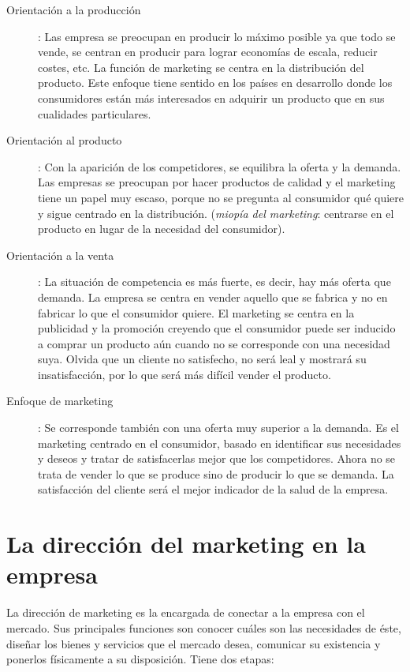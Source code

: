 \documentclass[10pt,a4paper,spanish]{report}
\begin{document}
		\begin{description}
			\item[Orientación a la producción]: Las empresa se preocupan en producir lo máximo posible ya que todo se vende, se centran en producir para lograr economías de escala, reducir costes, etc. La función de marketing se centra en la distribución del producto. Este enfoque tiene sentido en los países en desarrollo donde los consumidores están más interesados en adquirir un producto que en sus cualidades particulares.

			\item[Orientación al producto]: Con la aparición de los competidores, se equilibra la oferta y la demanda. Las empresas se preocupan por hacer productos de calidad y el marketing tiene un papel muy escaso, porque no se pregunta al consumidor qué quiere y sigue centrado en la distribución. (\textit{\textcolor[rgb]{0.1,0.2,0.4}{miopía del marketing}}: centrarse en el producto en lugar de la necesidad del consumidor).

			\item[Orientación a la venta]: La situación de competencia es más fuerte, es decir, hay más oferta que demanda. La empresa se centra en vender aquello que se fabrica y no en fabricar lo que el consumidor quiere. El marketing se centra en la publicidad y la promoción creyendo que el consumidor puede ser inducido a comprar un producto aún cuando no se corresponde con una necesidad suya. Olvida que un cliente no satisfecho, no será leal y mostrará su insatisfacción, por lo que será más difícil vender el producto.

			\item[Enfoque de marketing]: Se corresponde también con una oferta muy superior a la demanda. Es el marketing centrado en el consumidor, basado en identificar sus necesidades y deseos y tratar de satisfacerlas mejor que los competidores. Ahora no se trata de vender lo que se produce sino de producir lo que se demanda. La satisfacción del cliente será el mejor indicador de la salud de la empresa.
		\end{description}

	\section{\textcolor[rgb]{0.1,0.2,0.4}La dirección del marketing en la empresa}

		La dirección de marketing es la encargada de conectar a la empresa con el mercado. Sus principales funciones son conocer cuáles son las necesidades de éste, diseñar los bienes y servicios que el mercado desea, comunicar su existencia y ponerlos físicamente a su disposición. Tiene dos etapas:
\end{document}
